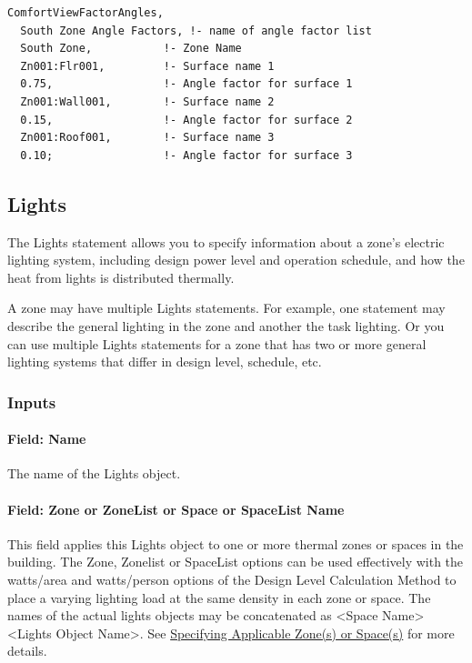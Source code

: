 \begin{lstlisting}
ComfortViewFactorAngles,
  South Zone Angle Factors, !- name of angle factor list
  South Zone,           !- Zone Name
  Zn001:Flr001,         !- Surface name 1
  0.75,                 !- Angle factor for surface 1
  Zn001:Wall001,        !- Surface name 2
  0.15,                 !- Angle factor for surface 2
  Zn001:Roof001,        !- Surface name 3
  0.10;                 !- Angle factor for surface 3
\end{lstlisting}

\subsection{Lights}\label{lights-000}

The Lights statement allows you to specify information about a zone's electric lighting system, including design power level and operation schedule, and how the heat from lights is distributed thermally.

A zone may have multiple Lights statements. For example, one statement may describe the general lighting in the zone and another the task lighting. Or you can use multiple Lights statements for a zone that has two or more general lighting systems that differ in design level, schedule, etc.

\subsubsection{Inputs}\label{inputs-2-021}

\paragraph{Field: Name}\label{field-name-2-020}

The name of the Lights object.

\paragraph{Field: Zone or ZoneList or Space or SpaceList Name}\label{lights-field-zone-or-zonelist-name-000}

This field applies this Lights object to one or more thermal zones or spaces in the building. The Zone, Zonelist or SpaceList options can be used effectively with the watts/area and watts/person options of the Design Level Calculation Method to place a varying lighting load at the same density in each zone or space. The names of the actual lights objects may be concatenated as \textless{}Space Name\textgreater{} \textless{}Lights Object Name\textgreater{}. See \hyperref[specifying-applicable-zones-or-spaces]{Specifying Applicable Zone(s) or Space(s)} for more details.

